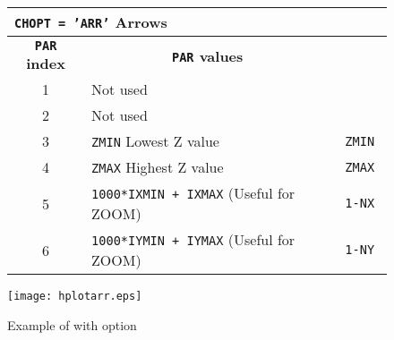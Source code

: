 \begin{figure}[p]
\begin{center}
\begin{tabular}{||c|p{11cm}|>{\tt}r||}
\hline
\multicolumn{3}{||l||}{\bf {\tt CHOPT = 'ARR'} Arrows}
\\
\hline
\multicolumn{1}{||c|}{\bf {\tt PAR} index}        &
\multicolumn{1}{c|}{\bf {\tt PAR} values}         &
\multicolumn{1}{c||}{\bf default}                \\
\hline
 1  & Not used                                                      &         \\
 2  & Not used                                                      &         \\
 3  & {\tt ZMIN} Lowest Z value                                     &   ZMIN  \\
 4  & {\tt ZMAX} Highest Z value                                    &   ZMAX  \\
 5  & {\tt 1000*IXMIN + IXMAX} (Useful for ZOOM)                    &   1-NX  \\
 6  & {\tt 1000*IYMIN + IYMAX} (Useful for ZOOM)                    &   1-NY  \\
\hline
\end{tabular}
\end{center}
\bigskip
\begin{center} \texttt{[image: hplotarr.eps]} \end{center}
\caption{Example of \protect{} with \protect{} option}
\end{figure}

